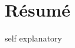 \documentclass[12pt,a4paper]{report}
\begin{document}
\chapter*{\huge Résumé}

    
self explanatory
\end{document}
